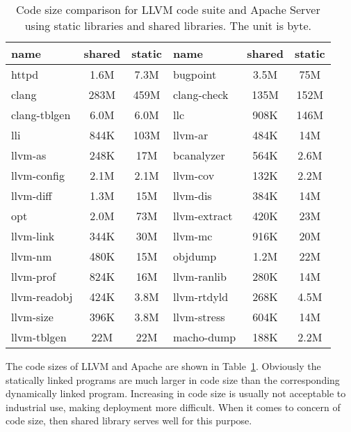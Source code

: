 \begin{table}[ht] \scriptsize
\begin{tabular}{|l|c|c||l|c|c|}
 \hline
 name & shared & static & name & shared & static \\
 \hline
httpd             &     1.6M & 7.3M &  bugpoint          &     3.5M & 75M   \\
clang             &     283M & 459M &   clang-check       &     135M & 152M   \\
clang-tblgen      &     6.0M & 6.0M &   llc               &     908K & 146M   \\
lli               &     844K & 103M &   llvm-ar           &     484K & 14M   \\
llvm-as           &     248K & 17M  &  bcanalyzer   &     564K & 2.6M   \\
llvm-config       &     2.1M & 2.1M &   llvm-cov          &     132K & 2.2M   \\
llvm-diff         &     1.3M & 15M  &  llvm-dis          &     384K & 14M   \\
 opt               &     2.0M & 73M &   llvm-extract      &     420K & 23M   \\
llvm-link         &     344K & 30M  &  llvm-mc           &     916K & 20M   \\
llvm-nm           &     480K & 15M  &  objdump      &     1.2M & 22M   \\
llvm-prof         &     824K & 16M  &  llvm-ranlib       &     280K & 14M   \\
llvm-readobj      &     424K & 3.8M &   llvm-rtdyld       &     268K & 4.5M   \\
llvm-size         &     396K & 3.8M &   llvm-stress       &     604K & 14M   \\
llvm-tblgen       &     22M & 22M   & macho-dump        &     188K & 2.2M   \\

\hline
\end{tabular}
\caption{Code size comparison for LLVM code suite and Apache Server using
static libraries and shared libraries. The unit is byte.}
\label{tab:codesize}
\end{table}
The code sizes of LLVM and Apache are shown in Table~\ref{tab:codesize}.
Obviously the statically linked programs are much larger in code size than the
corresponding dynamically linked program. Increasing in code size is usually
not acceptable to industrial use, making deployment more difficult. When it
comes to concern of code size, then shared library serves well for this
purpose.

